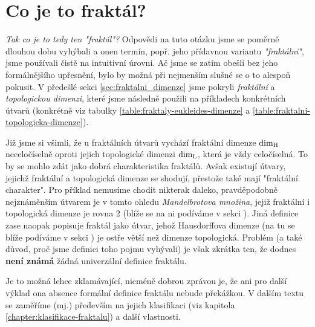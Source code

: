 \section{Co je to fraktál?}\label{sec:co-je-to-fraktal}
\emph{Tak co je to tedy ten "fraktál"?} Odpovědi na tuto otázku jsme se poměrně dlouhou dobu vyhýbali a onen termín, popř. jeho přídavnou variantu \emph{"fraktální"}, jsme používali čistě na intuitivní úrovni. Ač jsme se zatím obešli bez jeho formálnějšího upřesnění, bylo by možná při nejmenším slušné se o to alespoň pokusit. V předešlé sekci \ref{sec:fraktalni_dimenze} jsme pokryli \emph{fraktální} a \emph{topologickou dimenzi}, které jsme následně použili na příkladech konkrétních útvarů (konkrétně viz tabulky \ref{table:fraktaly-eukleides-dimenze} a \ref{table:fraktalni-topologicka-dimenze}).

Již jsme si všimli, že u fraktálních útvarů vychází fraktální dimenze $\operatorname{dim_H}$ neceločíselně oproti jejich topologické dimenzi $\operatorname{dim_L}$, která je vždy celočíselná. To by se mohlo zdát jako dobrá charakteristika fraktálů. Avšak existují útvary, jejichž fraktální a topologická dimenze se shodují, přestože také mají "fraktální charakter". Pro příklad nemusíme chodit nikterak daleko, pravděpodobně nejznáměnším útvarem je v tomto ohledu \emph{Mandelbrotova množina}, jejiž fraktální i topologická dimenze je rovna $2$ (blíže se na ni podíváme v sekci ). Jiná definice zase naopak popisuje fraktál jako útvar, jehož Hausdorffova dimenze (na tu se blíže podíváme v sekci ) je ostře větší než dimenze topologická. Problém (a také důvod, proč jsme definici toho pojmu vyhývali) je však zkrátka ten, že dodnes \textbf{není známá} žádná univerzální definice fraktálu. \cite[str. 226]{Voracova2022}

Je to možná lehce zklamávající, nicméně dobrou zprávou je, že ani pro další výklad ona absence formální definice fraktálu nebude překážkou. V dalším textu se zaměříme (mj.) především na jejich klasifikaci (viz kapitola \ref{chapter:klasifikace-fraktalu}) a další vlastnosti.